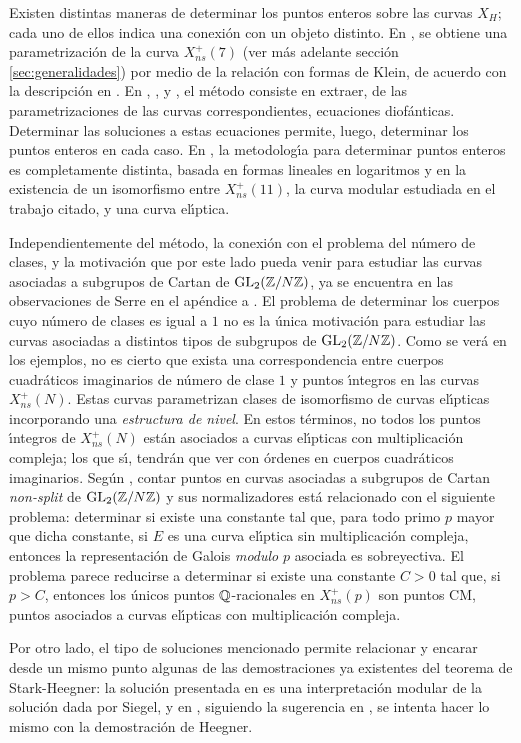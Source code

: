 Existen distintas maneras de determinar los puntos enteros sobre las curvas
$X_{H}$; cada uno de ellos indica una conexi\'{o}n con un objeto distinto. En
\cite{kenkuLevelSeven}, se obtiene una parametrizaci\'{o}n de
la curva $X_{ns}^{+}(7)$ (ver m\'{a}s adelante secci\'{o}n \ref{sec:generalidades})
por medio de la relaci\'{o}n con formas de Klein, de acuerdo con la descripci\'{o}n
en \cite{ligozat}. En \cite{baranLevelNine}, \cite{baranNormalizers}, \cite{booher}
y \cite{chenLevelFive}, el m\'{e}todo consiste en extraer, de las parametrizaciones
de las curvas correspondientes, ecuaciones diof\'{a}nticas. Determinar las
soluciones a estas ecuaciones permite, luego, determinar los puntos enteros en cada
caso.
En \cite{schoofTzanakisLevelEleven}, la metodolog\'{\i}a para determinar puntos
enteros es completamente distinta, basada en formas lineales en logaritmos y en la
existencia de un isomorfismo entre $X_{ns}^{+}(11)$, la curva modular estudiada en
el trabajo citado, y una curva el\'{\i}ptica.

Independientemente del m\'{e}todo, la conexi\'{o}n
con el problema del n\'{u}mero de clases, y la motivaci\'{o}n que por este lado
pueda venir para estudiar las curvas asociadas a subgrupos de Cartan de
$\mathrm{GL}_{2}(\mathbb{Z}/N\mathbb{Z})$, ya se encuentra en las observaciones de Serre en el
ap\'{e}ndice a \cite{serre}.
El problema de determinar los cuerpos cuyo n\'{u}mero de clases es igual a $1$
no es la \'{u}nica motivaci\'{o}n para estudiar las curvas asociadas a distintos
tipos de subgrupos de $\mathrm{GL}_{2}(\mathbb{Z}/N\mathbb{Z})$. Como se ver\'{a} en los ejemplos,
no es cierto que exista una correspondencia entre cuerpos cuadr\'{a}ticos
imaginarios de n\'{u}mero de clase $1$ y puntos \'{\i}ntegros en las curvas
$X_{ns}^{+}(N)$. Estas curvas parametrizan clases de isomorfismo de curvas
el\'{\i}pticas incorporando una \emph{estructura de nivel}. En estos t\'{e}rminos,
no todos los puntos \'{\i}ntegros de $X_{ns}^{+}(N)$ est\'{a}n asociados a curvas
el\'{\i}pticas con multiplicaci\'{o}n compleja; los que s\'{\i}, tendr\'{a}n que
ver con \'{o}rdenes en cuerpos cuadr\'{a}ticos imaginarios. Seg\'{u}n
\cite{baranAnExceptionalIso}, contar puntos en curvas asociadas a subgrupos de
Cartan \textit{non-split} de $\mathrm{GL}_{2}(\mathbb{Z}/N\mathbb{Z})$ y sus normalizadores est\'{a}
relacionado con el siguiente problema: determinar si existe una constante
tal que, para todo primo $p$ mayor que dicha constante, si $E$ es una curva
el\'{\i}ptica sin multiplicaci\'{o}n compleja, entonces la representaci\'{o}n de
Galois \textit{modulo} $p$ asociada es sobreyectiva. El problema parece reducirse a
determinar si existe una constante $C>0$ tal que, si $p>C$, entonces los \'{u}nicos
puntos $\mathbb{Q}$-racionales en $X_{ns}^{+}(p)$ son puntos CM, puntos asociados a
curvas el\'{\i}pticas con multiplicaci\'{o}n compleja.

Por otro lado, el tipo de soluciones mencionado permite relacionar y encarar desde
un mismo punto algunas de las demostraciones ya existentes del teorema
de Stark-Heegner: la soluci\'{o}n presentada en \cite{chenLevelFive} es
una interpretaci\'{o}n modular de la soluci\'{o}n dada por Siegel, y en
\cite{booher}, siguiendo la sugerencia en \cite{serre}, se intenta hacer lo
mismo con la demostraci\'{o}n de Heegner.